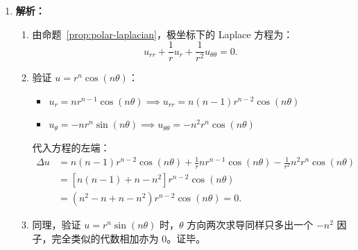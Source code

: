 \documentclass[lang=cn,11pt]{elegantbook}
\begin{document}
\begin{solution}
\begin{enumerate}
  \item[(1)] \textbf{解析：}
  \begin{enumerate}
      \item 由命题~\ref{prop:polar-laplacian}，极坐标下的 Laplace 方程为：
      \[
      u_{rr} + \frac{1}{r}u_r + \frac{1}{r^2}u_{\theta\theta} = 0.
      \]
      \item 验证 $u=r^n\cos(n\theta)$：
      \begin{itemize}
          \item $u_r = n r^{n-1}\cos(n\theta) \implies u_{rr} = n(n-1)r^{n-2}\cos(n\theta)$
          \item $u_\theta = -n r^n\sin(n\theta) \implies u_{\theta\theta} = -n^2 r^n\cos(n\theta)$
      \end{itemize}
      代入方程的左端：
      \begin{align*}
      \Delta u &= n(n-1)r^{n-2}\cos(n\theta) + \frac{1}{r}n r^{n-1}\cos(n\theta) - \frac{1}{r^2}n^2 r^n\cos(n\theta) \\[6pt]
      &= \left[ n(n-1) + n - n^2 \right] r^{n-2}\cos(n\theta) \\[6pt]
      &= (n^2 - n + n - n^2) r^{n-2}\cos(n\theta) = 0.
      \end{align*}
      \item 同理，验证 $u=r^n\sin(n\theta)$ 时，$\theta$ 方向两次求导同样只多出一个 $-n^2$ 因子，完全类似的代数相加亦为 $0$。证毕。
  \end{enumerate}


\end{enumerate}
\end{solution}
\end{document}
